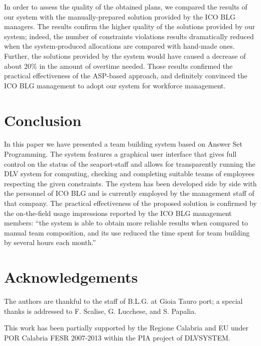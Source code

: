\documentclass{tlp}
\begin{document}
In order to assess the quality of the obtained plans, we compared the results
of our system
with the manually-prepared solution provided by the ICO BLG managers.
The results confirm the higher quality of the solutions provided by our system;
indeed,
the number of constraints violations results dramatically reduced when
the system-produced allocations are compared with hand-made ones.
Further, the solutions provided by the system would have caused a decrease of
about 20\% in
the amount of overtime needed.
Those results confirmed the practical effectiveness of the ASP-based approach, and
definitely convinced the ICO BLG management to adopt our system for workforce management.

\section{Conclusion}\label{sec:conclusion}

In this paper we have presented a team building system based on Answer Set Programming.
The system features a graphical user interface that gives full control
on the status of the seaport-staff and allows for transparently running
the DLV system for computing, checking and completing suitable
teams of employees respecting the given constraints.
The system has been developed side by side with the personnel of ICO BLG
and is currently employed by the management staff of that company.
The practical effectiveness of the proposed solution
is confirmed by the on-the-field usage impressions reported by the ICO BLG
management members: ``the system is able to obtain more reliable results
when compared to manual team composition, and its use reduced
the time spent for team building by several hours each month.''

\section*{Acknowledgements}
The authors are thankful to the staff of B.L.G. at Gioia Tauro port;
a special thanks is addressed to F. Scalise, G. Lucchese, and S. Papalia.

This work has been partially supported by the Regione Calabria and EU
under POR Calabria FESR 2007-2013 within the PIA project of DLVSYSTEM.



\end{document}
